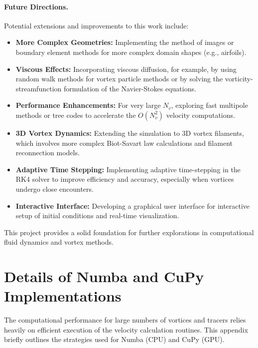 \documentclass[12pt,letterpaper]{article}
\begin{document}
\paragraph{Future Directions.}
Potential extensions and improvements to this work include:
\begin{itemize}[leftmargin=1.8em]
 \item \textbf{More Complex Geometries:} Implementing the method of images or boundary element methods for more complex domain shapes (e.g., airfoils).
 \item \textbf{Viscous Effects:} Incorporating viscous diffusion, for example, by using random walk methods for vortex particle methods or by solving the vorticity-streamfunction formulation of the Navier-Stokes equations.
 \item \textbf{Performance Enhancements:} For very large $N_v$, exploring fast multipole methods or tree codes to accelerate the $O(N_v^2)$ velocity computations.
 \item \textbf{3D Vortex Dynamics:} Extending the simulation to 3D vortex filaments, which involves more complex Biot-Savart law calculations and filament reconnection models.
 \item \textbf{Adaptive Time Stepping:} Implementing adaptive time-stepping in the RK4 solver to improve efficiency and accuracy, especially when vortices undergo close encounters.
 \item \textbf{Interactive Interface:} Developing a graphical user interface for interactive setup of initial conditions and real-time visualization.
\end{itemize}
This project provides a solid foundation for further explorations in computational fluid dynamics and vortex methods.


\appendix
\section{Details of Numba and CuPy Implementations}
The computational performance for large numbers of vortices and tracers relies heavily on efficient execution of the velocity calculation routines. This appendix briefly outlines the strategies used for Numba (CPU) and CuPy (GPU).
\end{document}

